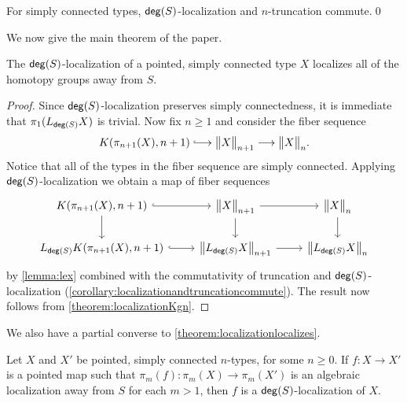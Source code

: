 \begin{cor}\label{corollary:localizationandtruncationcommute}
    For simply connected types, $\mathsf{deg}(S)$-localization and $n$-trunca\-tion commute.\qed
\end{cor}

We now give the main theorem of the paper.

\begin{thm}\label{theorem:localizationlocalizes}
    The $\mathsf{deg}(S)$-localization of a pointed, simply connected type $X$ localizes all of the
    homotopy groups away from $S$.
\end{thm}

\begin{proof}
    Since $\mathsf{deg}(S)$-localization preserves simply connectedness, it is immediate that $\pi_1(L_{\mathsf{deg}(S)} X)$ is trivial.
    Now fix $n \geq 1$ and consider the fiber sequence
    \[
        K(\pi_{n+1}(X),n+1) \longhookrightarrow \ttrunc{n+1}{X} \lra \ttrunc{n}{X}.
    \]
    Notice that all of the types in the fiber sequence are simply connected.
    Applying $\mathsf{deg}(S)$-localization we obtain a map of fiber sequences
\begin{equation*}
\begin{tikzcd}
K(\pi_{n+1}(X),n+1) \arrow[d] \arrow[r,hookrightarrow] & \ttrunc{n+1}{X} \arrow[d] \arrow[r] & \ttrunc{n}{X} \arrow[d] \\
L_{\degg(S)} K(\pi_{n+1}(X),n+1) \arrow[r,hookrightarrow] & \ttrunc{n+1}{L_{\degg(S)}X} \arrow[r] & \ttrunc{n}{L_{\degg(S)} X}
\end{tikzcd}
\end{equation*} 
    by \cref{lemma:lex} combined with the commutativity of truncation and
    $\mathsf{deg}(S)$-localization (\cref{corollary:localizationandtruncationcommute}).
    The result now follows from \cref{theorem:localizationKgn}.
\end{proof}

We also have a partial converse to \cref{theorem:localizationlocalizes}.

\begin{thm}\label{theorem:characterize-localization}
  Let $X$ and $X'$ be pointed, simply connected $n$-types, for some $n \geq 0$.
  If $f : X \to X'$ is a pointed map such that $\pi_m(f) : \pi_m(X) \to \pi_m(X')$ is
  an algebraic localization away from $S$ for each $m > 1$,
  then $f$ is a $\mathsf{deg}(S)$-localization of $X$.
\end{thm}

